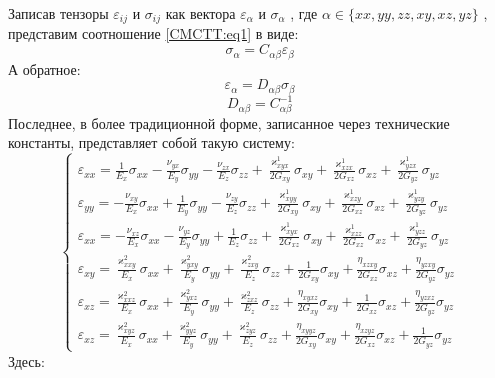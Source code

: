 Записав тензоры 
$\varepsilon_{ij}$ 
и 
$\sigma_{ij}$ 
как вектора 
$\varepsilon_{\alpha}$ 
и
$\sigma_{\alpha}$
, где 
$\alpha \in \{xx, yy, zz, xy, xz, yz\}$
, представим соотношение \ref{CMCTT:eq1} в виде:
\begin{equation}
    \label{CMCTT:eq3}
    \sigma_{\alpha} = C_{\alpha\beta}\varepsilon_{\beta}
\end{equation}
А обратное:
$$
    \varepsilon_{\alpha} = D_{\alpha\beta}\sigma_{\beta}
$$
$$
D_{\alpha\beta} = C^{-1}_{\alpha\beta}
$$
Последнее, в более традиционной форме, записанное через технические константы, представляет собой такую систему:
\begin{equation*}
    \begin{cases}
        \varepsilon_{xx} = \frac{1}{E_x}\sigma_{xx} - \frac{\nu_{yx}}{E_y}\sigma_{yy} - \frac{\nu_{zx}}{E_z}\sigma_{zz} + \frac{\varkappa^1_{xyx}}{2G_{xy}}\sigma_{xy} + \frac{\varkappa^1_{xzx}}{2G_{xz}}\sigma_{xz} + \frac{\varkappa^1_{yzx}}{2G_{yz}}\sigma_{yz}\\
        \varepsilon_{yy} = - \frac{\nu_{xy}}{E_x}\sigma_{xx} + \frac{1}{E_y}\sigma_{yy} - \frac{\nu_{zy}}{E_z}\sigma_{zz} + \frac{\varkappa^1_{xyy}}{2G_{xy}}\sigma_{xy} + \frac{\varkappa^1_{xzy}}{2G_{xz}}\sigma_{xz} + \frac{\varkappa^1_{yzy}}{2G_{yz}}\sigma_{yz}\\
        \varepsilon_{xx} = - \frac{\nu_{xz}}{E_x}\sigma_{xx} - \frac{\nu_{yz}}{E_y}\sigma_{yy} + \frac{1}{E_z}\sigma_{zz} + \frac{\varkappa^1_{xyx}}{2G_{xz}}\sigma_{xy} + \frac{\varkappa^1_{xzz}}{2G_{xz}}\sigma_{xz} + \frac{\varkappa^1_{yzz}}{2G_{yz}}\sigma_{yz}\\
        \varepsilon_{xy} = \frac{\varkappa^2_{xxy}}{E_x}\sigma_{xx} + \frac{\varkappa^2_{yxy}}{E_y}\sigma_{yy} + \frac{\varkappa^2_{zxy}}{E_z}\sigma_{zz} + \frac{1}{2G_{xy}}\sigma_{xy} + \frac{\eta_{xzxy}}{2G_{xz}}\sigma_{xz} + \frac{\eta_{yzxy}}{2G_{yz}}\sigma_{yz}\\
        \varepsilon_{xz} = \frac{\varkappa^2_{xxz}}{E_x}\sigma_{xx} + \frac{\varkappa^2_{yxz}}{E_y}\sigma_{yy} + \frac{\varkappa^2_{zxz}}{E_z}\sigma_{zz} + \frac{\eta_{xyxz}}{2G_{xy}}\sigma_{xy} + \frac{1}{2G_{xz}}\sigma_{xz} + \frac{\eta_{yzxz}}{2G_{yz}}\sigma_{yz}\\
        \varepsilon_{xz} = \frac{\varkappa^2_{xyz}}{E_x}\sigma_{xx} + \frac{\varkappa^2_{yyz}}{E_y}\sigma_{yy} + \frac{\varkappa^2_{zyz}}{E_z}\sigma_{zz} + \frac{\eta_{xyyz}}{2G_{xy}}\sigma_{xy} + \frac{\eta_{xzyz}}{2G_{xz}}\sigma_{xz} + \frac{1}{2G_{yz}}\sigma_{yz}
    \end{cases}
\end{equation*}
Здесь:

